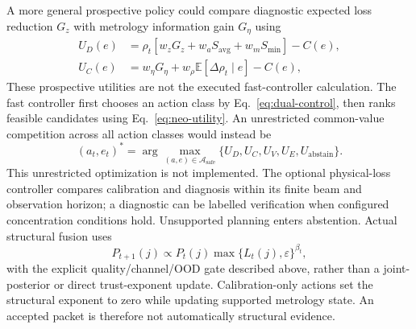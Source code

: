 \documentclass[conference]{IEEEtran}
\newcommand{\E}{\mathbb{E}}
\newcommand{\eps}{\varepsilon}
\begin{document}
A more general prospective policy could compare diagnostic expected loss reduction $G_z$ with metrology information gain $G_\eta$ using
\begin{align}
 U_D(e)&=\rho_t\!\left[w_zG_z+w_aS_{\mathrm{avg}}+w_mS_{\min}\right]-C(e),\nonumber\\
 U_C(e)&=w_\eta G_\eta+w_\rho\E[\Delta\rho_t\mid e]-C(e),
 \label{eq:tgcdi-utility}
\end{align}
These prospective utilities are not the executed fast-controller calculation. The fast controller first chooses an action class by Eq.~\eqref{eq:dual-control}, then ranks feasible candidates using Eq.~\eqref{eq:neo-utility}. An unrestricted common-value competition across all action classes would instead be
\begin{equation}
 (a_t,e_t)^*=\arg\max_{(a,e)\in\mathcal A_{\mathrm{safe}}}
 \{U_D,U_C,U_V,U_E,U_{\mathrm{abstain}}\}.
 \label{eq:tgcdi-policy}
\end{equation}
This unrestricted optimization is not implemented. The optional physical-loss controller compares calibration and diagnosis within its finite beam and observation horizon; a diagnostic can be labelled verification when configured concentration conditions hold. Unsupported planning enters abstention. Actual structural fusion uses
\begin{equation}
 P_{t+1}(j)\propto P_t(j)\max\{L_t(j),\eps\}^{\beta_t},
 \label{eq:tgcdi-update}
\end{equation}
with the explicit quality/channel/OOD gate described above, rather than a joint-posterior or direct trust-exponent update. Calibration-only actions set the structural exponent to zero while updating supported metrology state. An accepted packet is therefore not automatically structural evidence.
\end{document}
